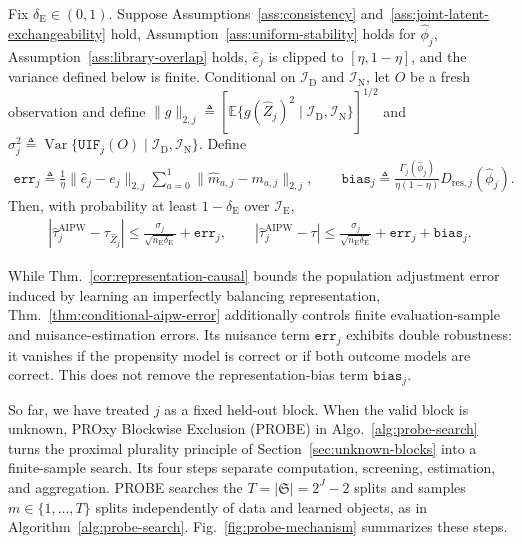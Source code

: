 \begin{theorem}
\label{thm:conditional-aipw-error}
Fix $\delta_{\mathrm E}\in(0,1)$. Suppose Assumptions~\ref{ass:consistency} and~\ref{ass:joint-latent-exchangeability} hold, Assumption~\ref{ass:uniform-stability} holds for $\widehat\phi_j$, Assumption~\ref{ass:library-overlap} holds, $\widehat e_j$ is clipped to $[\eta,1-\eta]$, and the variance defined below is finite. Conditional on $\mathcal I_{\mathrm D}$ and $\mathcal I_{\mathrm N}$, let $O$ be a fresh observation and define $\|g\|_{2,j}\triangleq[\mathbb E\{g(\widehat Z_j)^2\mid\mathcal I_{\mathrm D},\mathcal I_{\mathrm N}\}]^{1/2}$ and $\sigma_j^2\triangleq\operatorname{Var}\{\mathtt{UIF}_j(O)\mid\mathcal I_{\mathrm D},\mathcal I_{\mathrm N}\}$. Define 
	\begin{align}
		\mathtt{err}_{j} \triangleq \frac{1}{\eta}\|\widehat e_j-e_j\|_{2,j}\sum_{a=0}^1\|\widehat m_{a,j}-m_{a,j}\|_{2,j},\qquad\mathtt{bias}_j\triangleq\frac{\Gamma_j(\widehat\phi_j)}{\eta(1-\eta)}D_{\mathrm{res},j}(\widehat\phi_j).
	\end{align}
	Then, with probability at least $1-\delta_{\mathrm E}$ over $\mathcal I_{\mathrm E}$,
\begin{align}
|\widehat\tau_j^{\mathrm{AIPW}}-\tau_{\widehat Z_j}| \le \frac{\sigma_j}{\sqrt{n_{\mathrm E}\delta_{\mathrm E}}}+\mathtt{err}_j, \qquad |\widehat\tau_j^{\mathrm{AIPW}}-\tau| \le \frac{\sigma_j}{\sqrt{n_{\mathrm E}\delta_{\mathrm E}}}+\mathtt{err}_j+\mathtt{bias}_j.
\label{eq:end-to-end-sensitivity}
\end{align}
\end{theorem}
While Thm.~\ref{cor:representation-causal} bounds the population adjustment error induced by learning an imperfectly balancing representation, Thm.~\ref{thm:conditional-aipw-error} additionally controls finite evaluation-sample and nuisance-estimation errors. Its nuisance term $\mathtt{err}_j$ exhibits double robustness: it vanishes if the propensity model is correct or if both outcome models are correct. This does not remove the representation-bias term $\mathtt{bias}_j$.

So far, we have treated $j$ as a fixed held-out block. When the valid block is unknown, PROxy Blockwise Exclusion (PROBE) in Algo.~\ref{alg:probe-search} turns the proximal plurality principle of Section~\ref{sec:unknown-blocks} into a finite-sample search. Its four steps separate computation, screening, estimation, and aggregation. PROBE searches the $T=|\mathfrak S|=2^J-2$ splits and samples $m\in\{1,\ldots,T\}$ splits independently of data and learned objects, as in Algorithm~\ref{alg:probe-search}. Fig.~\ref{fig:probe-mechanism} summarizes these steps.

